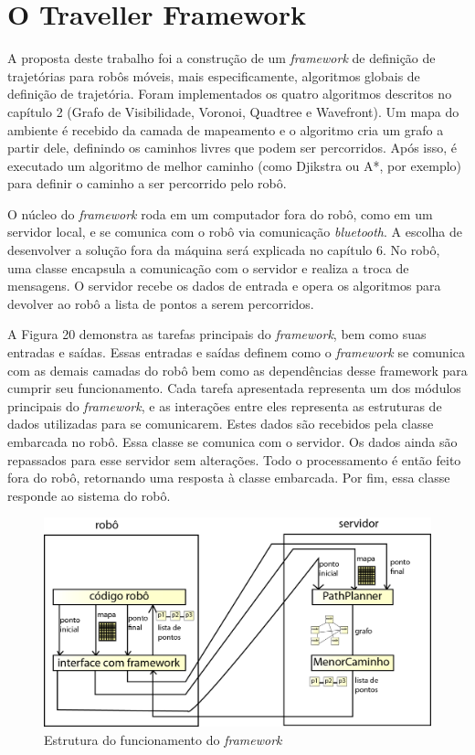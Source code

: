 \chapter[O Traveller Framework]{O Traveller Framework}

A proposta deste trabalho foi a construção de um \textit{framework} de definição de trajetórias para robôs móveis, mais especificamente, algoritmos globais de definição de trajetória. Foram implementados os quatro algoritmos descritos no capítulo 2 (Grafo de Visibilidade, Voronoi, Quadtree e Wavefront). Um mapa do ambiente é recebido da camada de mapeamento e o algoritmo cria um grafo a partir dele, definindo os caminhos livres que podem ser percorridos. Após isso, é executado um algoritmo de melhor caminho (como Djikstra ou A*, por exemplo) para definir o caminho a ser percorrido pelo robô. 

O núcleo do \textit{framework} roda em um computador fora do robô, como em um servidor local, e se comunica com o robô via comunicação \textit{bluetooth}. A escolha de desenvolver a solução fora da máquina será explicada no capítulo 6. No robô, uma classe encapsula a comunicação com o servidor e realiza a troca de mensagens. O servidor recebe os dados de entrada e opera os algoritmos para devolver ao robô a lista de pontos a serem percorridos.

A Figura 20 demonstra as tarefas principais do \textit{framework}, bem como suas entradas e saídas. Essas entradas e saídas definem como o \textit{framework} se comunica com as demais camadas do robô bem como as dependências desse framework para cumprir seu funcionamento. Cada tarefa apresentada representa um dos módulos principais do \textit{framework}, e as interações entre eles representa as estruturas de dados utilizadas para se comunicarem. Estes dados são recebidos pela classe embarcada no robô. Essa classe se comunica com o servidor. Os dados ainda são repassados para esse servidor sem alterações. Todo o processamento é então feito fora do robô, retornando uma resposta à classe embarcada. Por fim, essa classe responde ao sistema do robô.
 
\begin{figure}[h]
	\centering
	\label{fig20}
		\includegraphics[keepaspectratio=true,scale=0.9]{figuras/framework.png}
	\caption{Estrutura do funcionamento do \textit{framework}}
\end{figure} 

